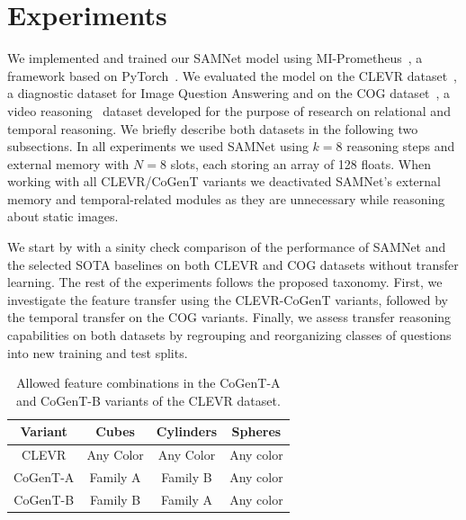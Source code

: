 \section{Experiments}
\label{sec:experiments}

We implemented and trained our SAMNet model using MI-Prometheus~\cite{kornuta2018accelerating}, a framework based on PyTorch~\cite{paszke2017automatic}.
We evaluated the model on 
the CLEVR dataset~\cite{johnson2017clevr}, a diagnostic dataset for Image Question Answering and on the COG dataset~\cite{yang2018dataset}, a video reasoning~\cite{mogadala2019trends} dataset developed for the purpose of research on relational and temporal reasoning.
We briefly describe both datasets in the following two subsections.
In all experiments we used SAMNet using $k = 8$ reasoning steps and external memory with $N = 8$ slots, each storing an array of 128 floats. 
When working with all CLEVR/CoGenT variants we deactivated SAMNet's external memory and temporal-related modules as they are unnecessary while reasoning about static images.

We start by with a sinity check comparison of the performance of SAMNet and the selected SOTA baselines on both CLEVR and COG datasets without transfer learning.
The rest of the experiments follows the proposed taxonomy.
First, we investigate the feature transfer using the CLEVR-CoGenT variants, followed by the temporal transfer on the COG variants. Finally, we assess transfer reasoning capabilities on both datasets by regrouping and reorganizing classes of questions into new training and test splits.

\begin{table}[b!]
	\centering
	\begin{tabular}{cccc}
		\toprule
		Variant	& Cubes	& Cylinders &	Spheres	\\
		\midrule
		CLEVR &  Any Color  & Any Color 	&	Any color  \\
		CoGenT-A &  Family A  & Family B 	&	Any color  \\
		CoGenT-B	&	Family B  &	Family A	&	Any color \\
		\bottomrule
	\end{tabular}
	\caption{Allowed feature combinations in the CoGenT-A and CoGenT-B variants of the CLEVR dataset.}%
	\label{tab:cogent_conditions}
\end{table}

